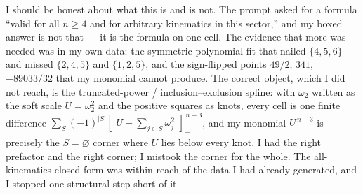 \documentclass{article}
\newcommand{\pp}[1]{\left[\,#1\,\right]_{+}}
\begin{document}
I should be honest about what this is and is not. The prompt asked for a formula
``valid for all $n\ge4$ and for arbitrary kinematics in this sector,'' and my
boxed answer is not that --- it is the formula on one cell. The evidence that more
was needed was in my own data: the symmetric-polynomial fit that nailed
$\{4,5,6\}$ and missed $\{2,4,5\}$ and $\{1,2,5\}$, and the sign-flipped points
$49/2$, $341$, $-89033/32$ that my monomial cannot produce. The correct object,
which I did not reach, is the truncated-power / inclusion--exclusion spline: with
$\omega_2$ written as the soft scale $U=\omega_2^2$ and the positive squares as
knots, every cell is one finite difference
$\sum_{S}(-1)^{|S|}\pp{\,U-\sum_{j\in S}\omega_j^2\,}^{\,n-3}$, and my monomial
$U^{\,n-3}$ is precisely the $S=\varnothing$ corner where $U$ lies below every
knot. I had the right prefactor and the right corner; I mistook the corner for the
whole. The all-kinematics closed form was within reach of the data I had already
generated, and I stopped one structural step short of it.
\end{document}
